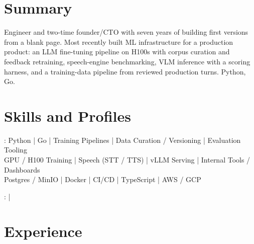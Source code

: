 \documentclass[print]{jack-resume}
\begin{document}
\pagecolor{darkmodeBackground}


\begin{minipage}[t][1cm][t]{.03\textwidth}
    \hfill
\end{minipage}

\section{Summary}
Engineer and two-time founder/CTO with seven years of building first versions from a blank page. Most recently built ML infrastructure for a production product: an LLM fine-tuning pipeline on H100s with corpus curation and feedback retraining, speech-engine benchmarking, VLM inference with a scoring harness, and a training-data pipeline from reviewed production turns. Python, Go.
\sectionsep

\section{Skills and Profiles}
:
Python \hfill | \hfill
Go \hfill | \hfill
Training Pipelines \hfill | \hfill
Data Curation / Versioning \hfill | \hfill
Evaluation Tooling \\
\hspace{1.0cm} GPU / H100 Training \hfill | \hfill
Speech (STT / TTS) \hfill | \hfill
vLLM Serving \hfill | \hfill
Internal Tools / Dashboards \\
\hspace{1.0cm} Postgres / MinIO \hfill | \hfill
Docker \hfill | \hfill
CI/CD \hfill | \hfill
TypeScript \hfill | \hfill
AWS / GCP \\

\raggedright{
    :
      \href{https://www.linkedin.com/in/jack-sturtevant/}{ \ExternalLink} |
     \href{https://github.com/jacksturt}{ \ExternalLink}}

\section{Experience}
\end{document}
